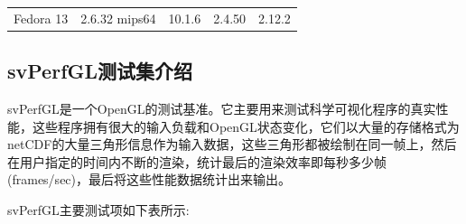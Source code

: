 \begin{center}  
\tablelasttail{\bottomrule}

\begin{supertabular}{p{3.cm}<{\centering}p{3.cm}<{\centering}p{3.cm}<{\centering}p{3.cm}<{\centering}p{3.cm}<{\centering}}
	Fedora 13& 2.6.32 mips64&  10.1.6& 2.4.50& 2.12.2\\
\end{supertabular}
\end{center}

\subsection{svPerfGL测试集介绍}

svPerfGL是一个OpenGL的测试基准。它主要用来测试科学可视化程序的真实性能，这些程序拥有很大的输入负载和OpenGL状态变化，它们以大量的存储格式为netCDF的大量三角形信息作为输入数据，这些三角形都被绘制在同一帧上，然后在用户指定的时间内不断的渲染，统计最后的渲染效率即每秒多少帧(frames/sec)，最后将这些性能数据统计出来输出。

svPerfGL主要测试项如下表所示:

